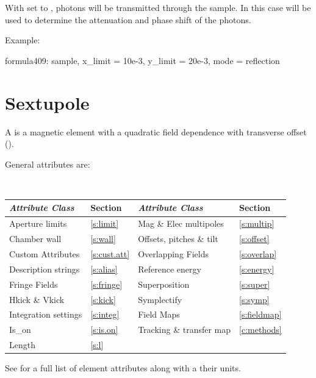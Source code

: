 {With  set to , photons will be transmitted
through the sample. In this case  will be used to
determine the attenuation and phase shift of the photons.

Example:
\begin{example}
  formula409: sample, x_limit = 10e-3, y_limit = 20e-3, mode = reflection
\end{example}

\section{Sextupole}
\label{s:sex}

A  is a magnetic element with a quadratic field
dependence with transverse offset ().

General  attributes are:
\begin{center}
\tt
\begin{tabular}{llll} \toprule
  {\sl Attribute Class}      & Section           & {\sl Attribute Class}      & Section           \\ \midrule
  Aperture limits            & \ref{s:limit}     & Mag \& Elec multipoles     & \ref{s:multip}    \\
  Chamber wall               & \ref{s:wall}      & Offsets, pitches \& tilt   & \ref{s:offset}    \\
  Custom Attributes          & \ref{s:cust.att}  & Overlapping Fields         & \ref{s:overlap}   \\
  Description strings        & \ref{s:alias}     & Reference energy           & \ref{s:energy}    \\ 
  Fringe Fields              & \ref{s:fringe}    & Superposition              & \ref{s:super}     \\
  Hkick \& Vkick             & \ref{s:kick}      & Symplectify                & \ref{s:symp}      \\
  Integration settings       & \ref{s:integ}     & Field Maps                 & \ref{s:fieldmap}  \\
  Is_on                      & \ref{s:is.on}     & Tracking \& transfer map   & \ref{c:methods}   \\ 
  Length                     & \ref{s:l}         &                            &                   \\ 
  \bottomrule
\end{tabular}
\end{center}
\toffset
See  for a full list of element attributes along with a their units.

}
